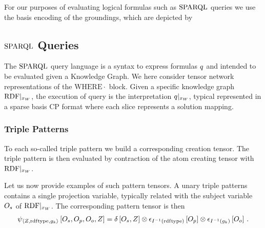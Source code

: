 

For our purposes of evaluating logical formulas such as $\mathrm{SPARQL}$ queries we use the basis encoding of the groundings, which are depicted by
\begin{center}
    
\end{center}




\subsection{$\mathrm{SPARQL}$ Queries}

The $\mathrm{SPARQL}$ query language is a syntax to express \firstOrderLogic{} formulas $q$ and intended to be evaluated given a Knowledge Graph.
We here consider tensor network representations of the $\mathrm{WHERE}{\cdot}$ block.
Given a specific knowledge graph ${\mathrm{RDF}}|_{x_{W}}$, the execution of query is the interpretation ${q}|_{x_{W}}$, typical represented in a sparse basis CP format where each slice represents a solution mapping.

\subsubsection{Triple Patterns}

To each so-called triple pattern we build a corresponding creation tensor. %
The triple pattern is then evaluated by contraction of the atom creating tensor with ${\mathrm{RDF}}|_{x_{W}}$.

Let us now provide examples of such pattern tensors.
A unary triple patterns contains a single projection variable, typically related with the subject variable $O_{s}$ of ${\mathrm{RDF}}|_{x_{W}}$.
The corresponding pattern tensor is then
\begin{align*}
    \psi_{\braket{Z,\mathrm{rdf}\mathrm{type},g_{k}}}\left[
        O_{s}, O_{p}, O_{o}, Z
    \right]
    = \delta\left[O_{s},Z\right]
    \otimes \epsilon_{I^{-1}(\mathrm{rdf}\mathrm{type})}\left[O_{p}\right]
    \otimes \epsilon_{I^{-1}(g_{k})}\left[O_{o}\right] \, .
\end{align*}

